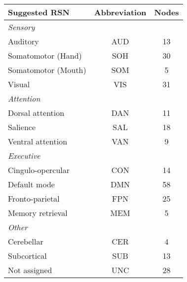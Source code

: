 \begin{tabular}{lcc}
\toprule 
Suggested RSN & Abbreviation & Nodes \\ 
\midrule 
\textit{Sensory} & & \\
	\hspace{3pt}Auditory  			&  AUD & 13 \\ 
	\hspace{3pt}Somatomotor (Hand)	&  SOH & 30 \\
	\hspace{3pt}Somatomotor (Mouth)	&  SOM & 5 \\
	\hspace{3pt}Visual	 			&  VIS & 31 \\ 
\textit{Attention} & & \\
	\hspace{3pt}Dorsal attention  	&  DAN & 11	\\ 
	\hspace{3pt}Salience		  	&  SAL & 18 \\ 
	\hspace{3pt}Ventral attention  	&  VAN & 9 \\ 
\textit{Executive} & & \\
	\hspace{3pt}Cingulo-opercular 	& CON & 14 \\ 
	\hspace{3pt}Default mode		& DMN & 58 \\
	\hspace{3pt}Fronto-parietal  	& FPN & 25 \\ 
	\hspace{3pt}Memory retrieval	& MEM & 5 \\
\textit{Other} & & \\
	\hspace{3pt}Cerebellar			& CER & 4  \\
	\hspace{3pt}Subcortical			& SUB & 13 \\
	\hspace{3pt}Not assigned 		& UNC & 28 \\ 
\bottomrule 
\end{tabular}